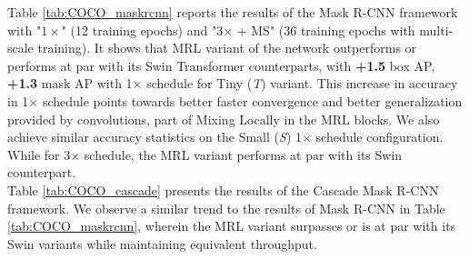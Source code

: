 \documentclass{article}
\begin{document}
\begin{table}[htbp]
  \centering
  \caption{Object detection and instance segmentation performance on the COCO val2017 with Cascade Mask R-CNN framework.}
  \label{tab:COCO_cascade}\end{table}

\noindent Table \ref{tab:COCO_maskrcnn} reports the results of the Mask R-CNN framework with "$1\times$" (12 training epochs) and "3$\times$ + MS" (36 training epochs with multi-scale training). It shows that MRL variant of the network outperforms or performs at par with its Swin Transformer counterparts, with \textbf{+1.5} box AP, \textbf{+1.3} mask AP with 1$\times$ schedule for Tiny (\textit{T}) variant. This increase in accuracy in 1$\times$ schedule points towards better faster convergence and better generalization provided by convolutions, part of Mixing Locally in the MRL blocks. We also achieve similar accuracy statistics on the Small (\textit{S}) 1$\times$ schedule configuration. While for 3$\times$ schedule, the MRL variant performs at par with its Swin counterpart. \\
\noindent Table \ref{tab:COCO_cascade} presents the results of the Cascade Mask R-CNN framework. We observe a similar trend to the results of Mask R-CNN in Table \ref{tab:COCO_maskrcnn}, wherein the MRL variant surpasses or is at par with its Swin variants while maintaining equivalent throughput.
\end{document}
